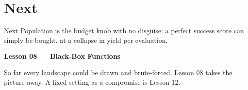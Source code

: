 \section{Next}

\begin{frame}{Next}
Population is the budget knob with no disguise: a perfect success score can simply be bought, at a collapse in yield per evaluation.

\vspace{0.8em}
\textbf{Lesson 08 --- Black-Box Functions}

So far every landscape could be drawn and brute-forced. Lesson 08 takes the picture away. A fixed setting as a compromise is Lesson 12.
\end{frame}


